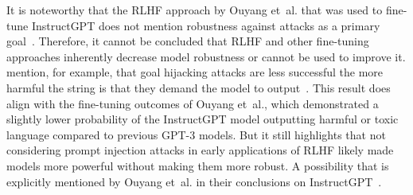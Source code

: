 It is noteworthy that the RLHF approach by Ouyang et~al. that was used to fine-tune InstructGPT does not mention robustness against attacks as a primary goal~\cite{ouyang_training_2022}.
Therefore, it cannot be concluded that RLHF and other fine-tuning approaches inherently decrease model robustness or cannot be used to improve it.
\perez mention, for example, that goal hijacking attacks are less successful the more harmful the string is that they demand the model to output~\cite{perez_ignore_2022}.
This result does align with the fine-tuning outcomes of Ouyang et~al., which demonstrated a slightly lower probability of the InstructGPT model outputting harmful or toxic language compared to previous GPT-3 models.
But it still highlights that not considering prompt injection attacks in early applications of RLHF likely made models more powerful without making them more robust.
A possibility that is explicitly mentioned by Ouyang et~al. in their conclusions on InstructGPT~\cite{ouyang_training_2022}.\\